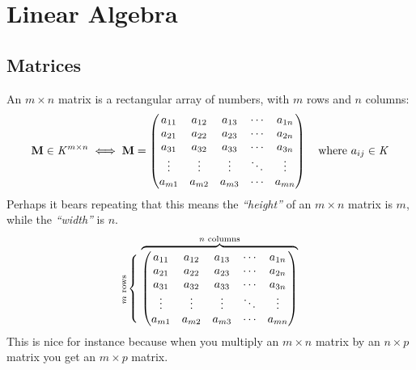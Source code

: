 \section{Linear Algebra}

\subsection{Matrices}

An \(m \times n\) matrix is a rectangular array of numbers, with \(m\) rows and
\(n\) columns:
\begin{equation*}
 \mathbf{M} \in \mathit{K}^{m \times n} \iff \mathbf{M} =
 \begin{pmatrix}
  a_{11} & a_{12} & a_{13} & \cdots & a_{1n} \\
  a_{21} & a_{22} & a_{23} & \cdots & a_{2n} \\
  a_{31} & a_{32} & a_{33} & \cdots & a_{3n} \\
  \vdots & \vdots & \vdots & \ddots & \vdots \\
  a_{m1} & a_{m2} & a_{m3} & \cdots & a_{mn}
 \end{pmatrix}
 \quad \text{where \(a_{ij} \in \mathit{K}\)}
\end{equation*}
Perhaps it bears repeating that this means the \emph{``height''} of an \(m
\times n\) matrix is \(m\), while the \emph{``width''} is \(n\).
\begin{equation*}
 \rotatebox[origin=c]{90}{
  \scriptsize{\(m\) rows}
  }
 \left\{\vphantom{\begin{matrix}
  \vphantom{} \\ \vphantom{} \\ \vphantom{} \\
  \vphantom{} \\ \vphantom{} \\
 \end{matrix}}\right.
 \overbrace{
  \begin{pmatrix}
   a_{11} & a_{12} & a_{13} & \cdots & a_{1n} \\
   a_{21} & a_{22} & a_{23} & \cdots & a_{2n} \\
   a_{31} & a_{32} & a_{33} & \cdots & a_{3n} \\
   \vdots & \vdots & \vdots & \ddots & \vdots \\
   a_{m1} & a_{m2} & a_{m3} & \cdots & a_{mn}
  \end{pmatrix}
 }^{\text{\(n\) columns}}
\end{equation*}
This is nice for instance because when you multiply an \(m \times n\) matrix by
an \(n \times p\) matrix you get an \(m \times p\) matrix.
